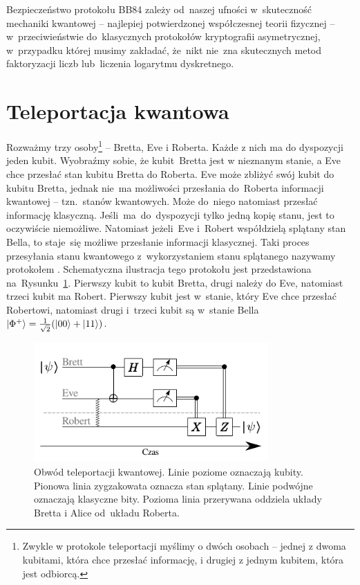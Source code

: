 Bezpieczeństwo protokołu BB84 zależy od~naszej ufności w~skuteczność
mechaniki kwantowej -- najlepiej potwierdzonej współczesnej teorii
fizycznej -- w~przeciwieństwie do~klasycznych protokołów kryptografii
asymetrycznej, w~przypadku której musimy zakładać, że~nikt nie~zna
skutecznych metod faktoryzacji liczb lub~liczenia logarytmu dyskretnego.

\section{Teleportacja kwantowa}
Rozważmy trzy osoby\footnote{Zwykle w protokole teleportacji myślimy o
	dwóch osobach -- jednej z dwoma kubitami, która chce przesłać informację,
	i drugiej z jednym kubitem, która jest odbiorcą.} -- Bretta, Eve i
Roberta. Każde z nich ma do dyspozycji jeden kubit. Wyobraźmy sobie, że
kubit~Bretta jest w nieznanym stanie, a Eve chce przesłać stan kubitu
Bretta do Roberta. Eve może zbliżyć swój kubit do kubitu Bretta, jednak
nie~ma możliwości przesłania do~Roberta informacji kwantowej --
tzn.~stanów kwantowych. Może do~niego natomiast przesłać informację
klasyczną. Jeśli~ma~do~dyspozycji tylko jedną kopię stanu, jest to oczywiście
niemożliwe. Natomiast jeżeli~Eve i~Robert współdzielą splątany stan
Bella, to staje~się możliwe przesłanie informacji klasycznej. Taki
proces przesyłania stanu kwantowego z~wykorzystaniem stanu splątanego
nazywamy protokołem . Schematyczna ilustracja tego protokołu jest przedstawiona
na~Rysunku~\ref{rys:teleportacja}. Pierwszy kubit to kubit Bretta, drugi należy do Eve, natomiast trzeci kubit ma
Robert. Pierwszy kubit jest w~stanie, który Eve chce przesłać Robertowi,
natomiast drugi i~trzeci kubit są w~stanie Bella
$\ket{\Phi^+}=\frac{1}{\sqrt{2}}(\ket{00}+\ket{11})$.

\begin{figure}[h]
	\centering
	\includegraphics[width=0.8\textwidth]{pics/teleportation} \caption{Obwód
		teleportacji kwantowej. Linie poziome oznaczają kubity. Pionowa linia
		zygzakowata oznacza stan splątany. Linie podwójne oznaczają klasyczne bity.
		Pozioma linia przerywana oddziela układy Bretta i Alice od~układu Roberta.}
	\label{rys:teleportacja}
\end{figure}


